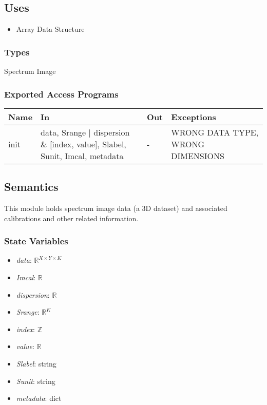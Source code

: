 \documentclass[12pt, titlepage]{article}
\begin{document}
\subsection{Uses}
\begin{itemize}
	\item Array Data Structure
\end{itemize}


\subsubsection{Types}
Spectrum Image

\subsubsection{Exported Access Programs}

\begin{center}
    \begin{tabular}{p{1.5cm} p{4cm} p{4cm} p{4cm}}
        \toprule
        \textbf{Name} & \textbf{In} & \textbf{Out} & \textbf{Exceptions} \\
        \midrule
        init & data, Srange $|$ dispersion $\&$ [index, value], Slabel, Sunit, Imcal, metadata & - & WRONG DATA TYPE, WRONG DIMENSIONS \\
        \bottomrule
    \end{tabular}
\end{center}

\subsection{Semantics}
This module holds spectrum image data (a 3D dataset) and associated calibrations and other related information.

\subsubsection{State Variables}
\begin{itemize}
	\item \textit{data}: $\mathbb{R}^{X \times Y \times K}$
	\item \textit{Imcal}: $\mathbb{R}$
	\item \textit{dispersion}: $\mathbb{R}$
	\item \textit{Srange}: $\mathbb{R}^{K}$
    \item \textit{index}: $\mathbb{Z}$
    \item \textit{value}: $\mathbb{R}$
	\item \textit{Slabel}: string
	\item \textit{Sunit}: string
	\item \textit{metadata}: dict
\end{itemize}
\end{document}
